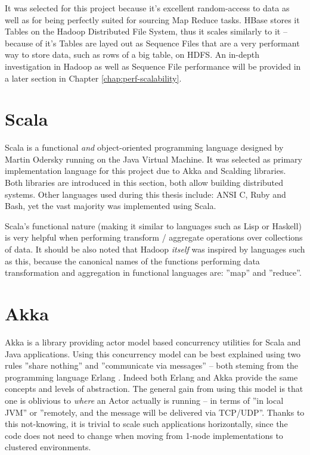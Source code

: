 It was selected for this project because it's excellent random-access to data as well as for being perfectly suited for sourcing Map Reduce tasks. HBase stores it Tables on the Hadoop Distributed File System, thus it scales similarly to it -- because of it's Tables are layed out as Sequence Files that are a very performant way to store data, such as rows of a big table, on HDFS. An in-depth investigation in Hadoop as well as Sequence File performance will be provided in a later section in Chapter \ref{chap:perf-scalability}.

\section{Scala}
\label{sec:scala}
Scala is a functional \textit{and} object-oriented programming language designed by Martin Odersky \cite{scala} running on the Java Virtual Machine. It was selected as primary implementation language for this project due to Akka and Scalding libraries. Both libraries are introduced in this section, both allow building distributed systems. Other languages used during this thesis include: ANSI C, Ruby and Bash, yet the vast majority was implemented using Scala.

Scala's functional nature (making it similar to languages such as Lisp or Haskell) is very helpful when performing transform / aggregate operations over collections of data. It should be also noted that Hadoop \textit{itself} was inspired by languages such as this, because the canonical names of the functions performing data transformation and aggregation in functional languages are: ''map'' and ''reduce''.

\section{Akka}
\label{sec:akka}

Akka is a library providing actor model \cite{actor-model} based concurrency utilities for Scala and Java applications. 
Using this concurrency model can be best explained using two rules ''share nothing'' and ''communicate via messages'' -- both steming from the programming language Erlang \cite{erlang}. Indeed both Erlang and Akka provide the same concepts and levels of abstraction. The general gain from using this model is that one is oblivious to \textit{where} an Actor  actually is running -- in terms of ''in local JVM'' or ''remotely, and the message will be delivered via TCP/UDP''. Thanks to this not-knowing, it is trivial to scale such applications horizontally, since the code does not need to change when moving from 1-node implementations to clustered environments.

